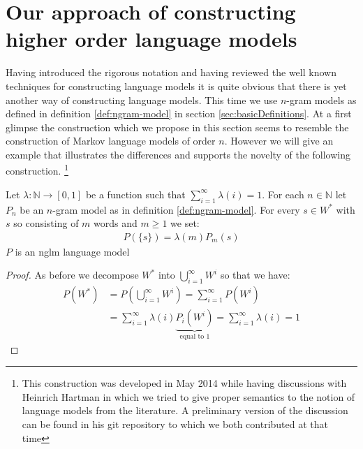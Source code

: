 \documentclass[•]{book}
\begin{document}
\section{Our approach of constructing higher order language models}
Having introduced the rigorous notation and having reviewed the well known techniques for constructing language models it is quite obvious that there is yet another way of constructing language models. 
This time we use $n$-gram models as defined in definition \ref{def:ngram-model} in section \ref{sec:basicDefinitions}. 
At a first glimpse the construction which we propose in this section seems to resemble the construction of Markov language models of order $n$. 
However we will give an example that illustrates the differences and supports the novelty of the following construction. \footnote{This construction was developed in May 2014 while having discussions with Heinrich Hartman in which we tried to give proper semantics to the notion of language models from the literature. A preliminary version of the discussion can be found in his git repository to which we both contributed at that time }
\begin{theorem}\label{thm:higherOrderLM}
Let $\lambda:\mathbb{N}\longrightarrow [0,1]$ be a function such that $\sum_{i=1}^\infty\lambda(i) = 1$. 
For each $n\in\mathbb{N}$ let $P_n$ be an $n$-gram model as in definition \ref{def:ngram-model}. 
For every $s \in W^{*}$ with $s$ so consisting of $m$ words and $m\geq 1$ we set:
\begin{align}
P(\{s\}) = \lambda(m)P_m({s})
\end{align}
$P$ is an \gls{nglm} language model 
\begin{proof}
As before we decompose $W^{*}$ into $\bigcup_{i=1}^\infty W^{i}$ so that we have:
\begin{align}
P(W^{*}) & = P(\bigcup_{i=1}^\infty W^{i}) =\sum_{i=1}^\infty P(W^{i})  \\
& =  \sum_{i=1}^\infty \lambda(i)\underbrace{P_i(W^{i})}_{\text{equal to 1}} = \sum_{i=1}^\infty \lambda(i) = 1
\end{align} 
\end{proof}
\end{theorem}
\end{document}
